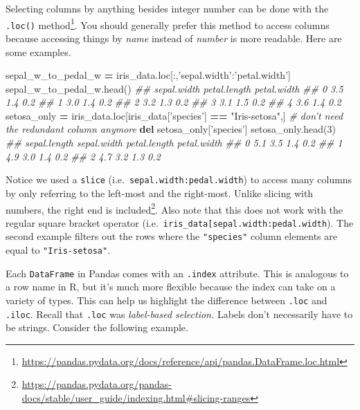 \documentclass[12pt,krantz2]{krantz}
\makeatletter
\newenvironment{Shaded}{\begin{snugshade}}{\end{snugshade}}
\newcommand{\CommentTok}[1]{\textcolor[rgb]{0.37,0.37,0.37}{\textit{#1}}}
\newcommand{\DecValTok}[1]{\textcolor[rgb]{0.06,0.06,0.06}{#1}}
\newcommand{\KeywordTok}[1]{\textcolor[rgb]{0.27,0.27,0.27}{\textbf{#1}}}
\newcommand{\NormalTok}[1]{#1}
\newcommand{\OperatorTok}[1]{\textcolor[rgb]{0.43,0.43,0.43}{\textbf{#1}}}
\newcommand{\StringTok}[1]{\textcolor[rgb]{0.5,0.5,0.5}{#1}}
\renewcommand{\href}[2]{#2\footnote{\url{#1}}}
\newenvironment{kframe}{%
\medskip{}
\setlength{\fboxsep}{.8em}
 \def\at@end@of@kframe{}%
 \ifinner\ifhmode%
  \def\at@end@of@kframe{\end{minipage}}%
  \begin{minipage}{\columnwidth}%
 \fi\fi%
 \def\FrameCommand##1{\hskip\@totalleftmargin \hskip-\fboxsep
 \colorbox{shadecolor}{##1}\hskip-\fboxsep
     \hskip-\linewidth \hskip-\@totalleftmargin \hskip\columnwidth}%
 \MakeFramed {\advance\hsize-\width
   \@totalleftmargin\z@ \linewidth\hsize
   \@setminipage}}%
 {\par\unskip\endMakeFramed%
 \at@end@of@kframe}
\renewenvironment{Shaded}{\begin{kframe}}{\end{kframe}}
\makeatother
\begin{document}
Selecting columns by anything besides integer number can be done with the \href{https://pandas.pydata.org/docs/reference/api/pandas.DataFrame.loc.html}{\texttt{.loc()} method}. You should generally prefer this method to access columns because accessing things by \emph{name} instead of \emph{number} is more readable. Here are some examples.

\begin{Shaded}
\begin{Highlighting}[]
\NormalTok{sepal_w_to_pedal_w }\OperatorTok{=}\NormalTok{ iris_data.loc[:,}\StringTok{'sepal.width'}\NormalTok{:}\StringTok{'petal.width'}\NormalTok{]}
\NormalTok{sepal_w_to_pedal_w.head()}
\CommentTok{##    sepal.width  petal.length  petal.width}
\CommentTok{## 0          3.5           1.4          0.2}
\CommentTok{## 1          3.0           1.4          0.2}
\CommentTok{## 2          3.2           1.3          0.2}
\CommentTok{## 3          3.1           1.5          0.2}
\CommentTok{## 4          3.6           1.4          0.2}
\NormalTok{setosa_only }\OperatorTok{=}\NormalTok{ iris_data.loc[iris_data[}\StringTok{'species'}\NormalTok{] }\OperatorTok{==} \StringTok{"Iris-setosa"}\NormalTok{,]}
\CommentTok{# don't need the redundant column anymore}
\KeywordTok{del}\NormalTok{ setosa_only[}\StringTok{'species'}\NormalTok{]}
\NormalTok{setosa_only.head(}\DecValTok{3}\NormalTok{)}
\CommentTok{##    sepal.length  sepal.width  petal.length  petal.width}
\CommentTok{## 0           5.1          3.5           1.4          0.2}
\CommentTok{## 1           4.9          3.0           1.4          0.2}
\CommentTok{## 2           4.7          3.2           1.3          0.2}
\end{Highlighting}
\end{Shaded}

Notice we used a \texttt{slice} (i.e.~\texttt{\textquotesingle{}sepal.width\textquotesingle{}:\textquotesingle{}pedal.width\textquotesingle{}}) to access many columns by only referring to the left-most and the right-most. Unlike slicing with numbers, \href{https://pandas.pydata.org/pandas-docs/stable/user_guide/indexing.html\#slicing-ranges}{the right end is included}. Also note that this does not work with the regular square bracket operator (i.e.~\texttt{iris\_data{[}\textquotesingle{}sepal.width\textquotesingle{}:\textquotesingle{}pedal.width\textquotesingle{}{]}}). The second example filters out the rows where the \texttt{"species"} column elements are equal to \texttt{"Iris-setosa"}.

Each \texttt{DataFrame} in Pandas comes with an \texttt{.index} attribute. This is analogous to a row name in R, but it's much more flexible because the index can take on a variety of types. This can help us highlight the difference between \texttt{.loc} and \texttt{.iloc}. Recall that \texttt{.loc} was \emph{label-based selection.} Labels don't necessarily have to be strings. Consider the following example.
\end{document}
